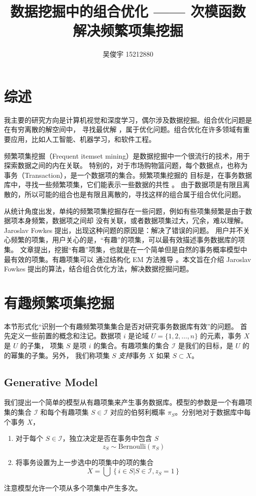 \documentclass{ctexart}
\title{数据挖掘中的组合优化 —— 次模函数解决频繁项集挖掘}
\author{吴俊宇 15212880}
\newcommand{\scri}[0]{\mathcal{I}}
\begin{document}
\date{}
\maketitle
\tableofcontents
\pagebreak

\section{综述}

我主要的研究方向是计算机视觉和深度学习，偶尔涉及数据挖掘。组合优化问题是在有穷离散的解空间中，
寻找最优解 \cite{cop-wiki}，属于优化问题。组合优化在许多领域有重要应用，比如人工智能、机器学习，和软件工程。

频繁项集挖掘（Frequent itemset mining）是数据挖掘中一个很流行的技术，用于探索数据之间的内在关联。
特别的，对于市场购物篮问题，每个数据点，也称为事务（Transaction），是一个数据项的集合。频繁项集挖掘的
目标是，在事务数据库中，寻找一些频繁项集，它们能表示一些数据的共性 \cite{hjw-book}。
由于数据项是有限且离散的，所以可能的组合也是有限且离散的，寻找这样的组合属于组合优化问题。

从统计角度出发，单纯的频繁项集挖掘存在一些问题，例如有些项集频繁是由于数据项本身频繁，数据项之间却
没有关联，或者数据项集过大，冗余，难以理解。Jaroslav Fowkes 提出，出现这种问题的原因是：解决了错误的问题。
用户并不关心频繁的项集，用户关心的是，“有趣”的项集，可以最有效描述事务数据库的项集\cite{this-paper}。
文章提出，挖掘“有趣”项集，也就是在一个简单但是自然的事务概率模型中最有效的项集。有趣项集可以
通过结构化 EM 方法推导 \cite{em-book}。本文旨在介绍 Jaroslav Fowkes 提出的算法，结合组合优化方法，解决数据挖掘问题。

\section{有趣频繁项集挖掘}

本节形式化“识别一个有趣频繁项集集合是否对研究事务数据库有效”的问题。
首先定义一些前置的概念和注记。数据项 $i$ 是论域 $U = \{1, 2, \dots, n\}$ 的元素，事务 $X$ 是 $U$ 的子集，
项集 $S$ 是项 $i$ 的集合。有趣项集的集合 $\mathcal I$ 是我们的目标，是 $U$ 的的幂集的子集。另外，
我们称项集 $S$ \textit{支持}事务 $X$ 如果 $S \subset X$。

\subsection{Generative Model}

我们提出一个简单的模型从有趣项集来产生事务数据库。模型的参数是一个有趣项集的集合 $\scri$ 和每个有趣项集
$S \in \scri$ 对应的伯努利概率 $\pi_S$。分别地对于数据库中每个事务 $X$，
\begin{enumerate}
	\item 对于每个 $S \in \scri$，独立决定是否在事务中包含 $S$
	$$
	z_S \sim \mathrm{Bernoulli}(\pi_S)
	$$
	\item 将事务设置为上一步选中的项集中的项的集合
	$$
	X = \bigcup \left\{ i \in S | S \in \scri, z_S = 1 \right\}
	$$
\end{enumerate}
注意模型允许一个项从多个项集中产生多次。
\end{document}
